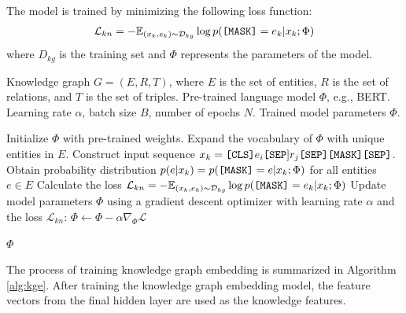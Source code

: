 The model is trained by minimizing the following loss function:
\begin{align}
\mathcal{L}_{kn} = - \mathbb{E}_{(x_k,e_k) \sim \mathcal{D}_{kg}}\log{p(\text{\texttt{[MASK]}} = e_k|x_k;\Phi)}
\end{align}
where $D_{kg}$ is the training set and $\Phi$ represents the parameters of the model.
\begin{algorithm}[hbt]
\caption{Knowledge graph embedding training}\label{alg:kge}
\begin{algorithmic}[1]
\REQUIRE Knowledge graph $G = (E, R, T)$, where $E$ is the set of entities, $R$ is the set of relations, and $T$ is the set of triples.
\REQUIRE Pre-trained language model $\Phi$, e.g., BERT.
\REQUIRE Learning rate $\alpha$, batch size $B$, number of epochs $N$.
\ENSURE Trained model parameters $\Phi$.

\STATE Initialize $\Phi$ with pre-trained weights.
\STATE Expand the vocabulary of $\Phi$ with unique entities in $E$.
        \STATE Construct input sequence $x_k = \text{\texttt{[CLS]}} e_i \text{\texttt{[SEP}]} r_j \text{\texttt{[SEP]}} \text{\texttt{[MASK]}} \text{\texttt{[SEP]}}$.
        \STATE Obtain probability distribution $p(e|x_k) = p(\text{\texttt{[MASK]}} = e|x_k;\Phi)$ for all entities $e \in E$
        \STATE Calculate the loss $\mathcal{L}_{kn} = - \mathbb{E}_{(x_k,e_k) \sim \mathcal{D}_{kg}}\log{p(\text{\texttt{[MASK]}} = e_k|x_k;\Phi)}$
        \STATE Update model parameters $\Phi$ using a gradient descent optimizer with learning rate $\alpha$ and the loss $\mathcal{L}_{kn}$: $\Phi \leftarrow \Phi - \alpha \nabla_\Phi\mathcal{L}$
    \ENDFOR
\ENDFOR

\RETURN $\Phi$
\end{algorithmic}
\end{algorithm}
The process of training knowledge graph embedding is summarized in Algorithm \ref{alg:kge}. After training the knowledge graph embedding model, the feature vectors from the final hidden layer are used as the knowledge features.

